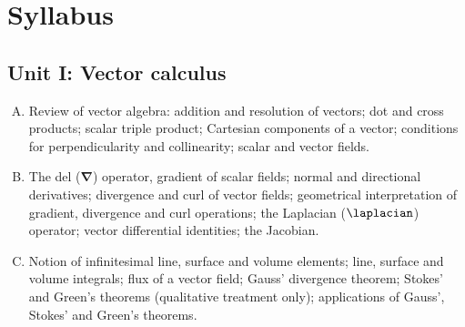 \section*{Syllabus}

    \subsection*{Unit I: Vector calculus}
        \begin{enumerate}[A.]
            \item Review of vector algebra: addition and resolution of vectors; dot and cross products; scalar triple product; Cartesian components of a vector; conditions for perpendicularity and collinearity; scalar and vector fields.
            \item The del ($\boldsymbol{\nabla}$) operator, gradient of scalar fields; normal and directional derivatives; divergence and curl of vector fields; geometrical interpretation of gradient, divergence and curl operations; the Laplacian ($\laplacian$) operator; vector differential identities; the Jacobian.
            \item Notion of infinitesimal line, surface and volume elements; line, surface and volume integrals; flux of a vector field; Gauss' divergence theorem; Stokes' and Green's theorems (qualitative treatment only); applications of Gauss', Stokes' and Green's theorems.
        \end{enumerate}